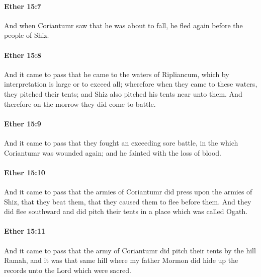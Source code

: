 		\paragraph{Ether 15:7} %
			\label{ETHER-15-7}

			And when Coriantumr saw that he was about to fall,
			he fled again before the people of Shiz.

		\paragraph{Ether 15:8} %
			\label{ETHER-15-8}

			And it came to pass that he came to the waters of Ripliancum,
			which by interpretation is large or to exceed all;
			wherefore when they came to these waters, they pitched their tents;
			and Shiz also pitched his tents near unto them.
			And therefore on the morrow they did come to battle.

		\paragraph{Ether 15:9} %
			\label{ETHER-15-9}

			And it came to pass that they fought an exceeding sore battle,
			in the which Coriantumr was wounded again;
			and he fainted with the loss of blood.

		\paragraph{Ether 15:10} %
			\label{ETHER-15-10}

			And it came to pass that
			the armies of Coriantumr did press upon the armies of Shiz,
			that they beat them,
			that they caused them to flee before them.
			And they did flee southward
			and did pitch their tents in a place which was called Ogath.

		\paragraph{Ether 15:11} %
			\label{ETHER-15-11}

			And it came to pass that
			the army of Coriantumr did pitch their tents by the hill Ramah,
			and it was that same hill
			where my father Mormon did hide up the records unto the Lord
			which were sacred.

